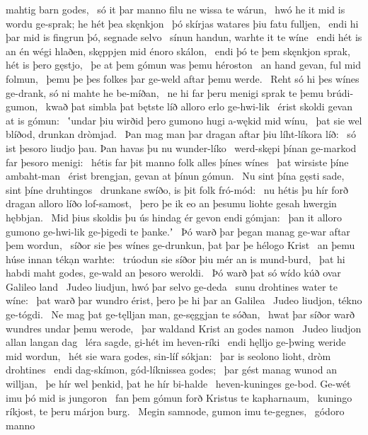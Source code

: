 mahtig barn godes, \hld\ só it þar manno filu
ne wissa te wárun, \hld\ hwó he it mid is wordu ge-sprak;
he hét þea skęnkjon \hld\ þó skírjas watares
þiu fatu fulljen, \hld\ endi hi þar mid is fingrun þó,
segnade selvo \hld\ sínun handun,
warhte it te wíne \hld\ endi hét is an én wégi hlaðen,
skęppjen mid énoro skálon, \hld\ endi þó te þem skęnkjon sprak,
hét is þero gęstjo, \hld\ þe at þem gómun was
þemu héroston \hld\ an hand gevan,
ful mid folmun, \hld\ þemu þe þes folkes þar
ge-weld aftar þemu werde. \hld\ Reht só hi þes wínes ge-drank,
só ni mahte he be-míðan, \hld\ ne hi far þeru menigi sprak
te þemu brúdi-gumon, \hld\ kwað þat simbla þat bętste líð
alloro erlo ge-hwi-lik \hld\ érist skoldi
gevan at is gómun: \hld\ ʽundar þiu wirðid þero gumono hugi
a-wękid mid wínu, \hld\ þat sie wel blíðod,
drunkan dròmjad. \hld\ Þan mag man þar dragan aftar þiu
líht-líkora líð: \hld\ só ist þesoro liudjo þau.
Þan havas þu nu wunder-líko \hld\ werd-skępi þínan
ge-markod far þesoro menigi: \hld\ hétis far þit manno folk
alles þínes wínes \hld\ þat wirsiste
þíne ambaht-man \hld\ érist brengjan,
gevan at þínun gómun. \hld\ Nu sint þína gęsti sade,
sint þíne druhtingos \hld\ drunkane swíðo,
is þit folk fró-mód: \hld\ nu hétis þu hír forð dragan
alloro líðo lof-samost, \hld\ þero þe ik eo an þesumu liohte gesah
hwergin hębbjan. \hld\ Mid þius skoldis þu ús hindag ér
gevon endi gómjan: \hld\ þan it alloro gumono ge-hwi-lik
ge-þigedi te þanke.ʼ \hld\ Þó warð þar þegan manag
ge-war aftar þem wordun, \hld\ síðor sie þes wínes ge-drunkun,
þat þar þe hélogo Krist \hld\ an þemu húse innan
tékạn warhte: \hld\ trúodun sie síðor
þiu mér an is mund-burd, \hld\ þat hi habdi maht godes,
ge-wald an þesoro weroldi. \hld\ Þó warð þat só wído kúð
ovar Galileo land \hld\ Judeo liudjun,
hwó þar selvo ge-deda \hld\ sunu drohtines
water te wíne: \hld\ þat warð þar wundro érist,
þero þe hi þar an Galilea \hld\ Judeo liudjon,
tékno ge-tógdi. \hld\ Ne mag þat ge-tęlljan man,
ge-sęggjan te sóðan, \hld\ hwat þar síðor warð
wundres undar þemu werode, \hld\ þar waldand Krist
an godes namon \hld\ Judeo liudjon
allan langan dag \hld\ léra sagde,
gi-hét im heven-ríki \hld\ endi hęlljo ge-þwing
weride mid wordun, \hld\ hét sie wara godes,
sin-líf sókjan: \hld\ þar is seolono lioht,
dròm drohtines \hld\ endi dag-skímon,
gód-líknissea godes; \hld\ þar gést manag
wunod an willjan, \hld\ þe hír wel þenkid,
þat he hír bi-halde \hld\ heven-kuninges ge-bod.
Ge-wét imu þó mid is jungoron \hld\ fan þem gómun forð
Kristus te kapharnaum, \hld\ kuningo ríkjost,
te þeru márjon burg. \hld\ Megin samnode,
gumon imu te-gegnes, \hld\ gódoro manno
